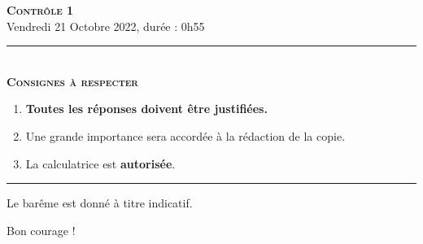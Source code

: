 \documentclass[11pt]{article}
\begin{document}

\begin{center}
\textbf{\LARGE \textsc{Contrôle 1}}\\[2mm]

{\large Vendredi 21 Octobre 2022, durée : 0h55}\\[1mm]
\noindent\rule{8cm}{0.4pt}\\[1mm]
\textbf{\textsc{Consignes à respecter}}
\begin{enumerate}[label=\textbf{\arabic*/}]
\item \textbf{Toutes les réponses doivent être justifiées.}
\item Une grande importance sera accordée à la rédaction de la
  copie.
\item La calculatrice est \textbf{autorisée}.
    \end{enumerate}
\noindent\rule{12cm}{0.4pt}
\end{center}

\vspace{2mm}
\noindent Le barême est donné à titre indicatif.
\vspace{2mm}
\begin{center}
  Bon courage !
\end{center}
\end{document}
